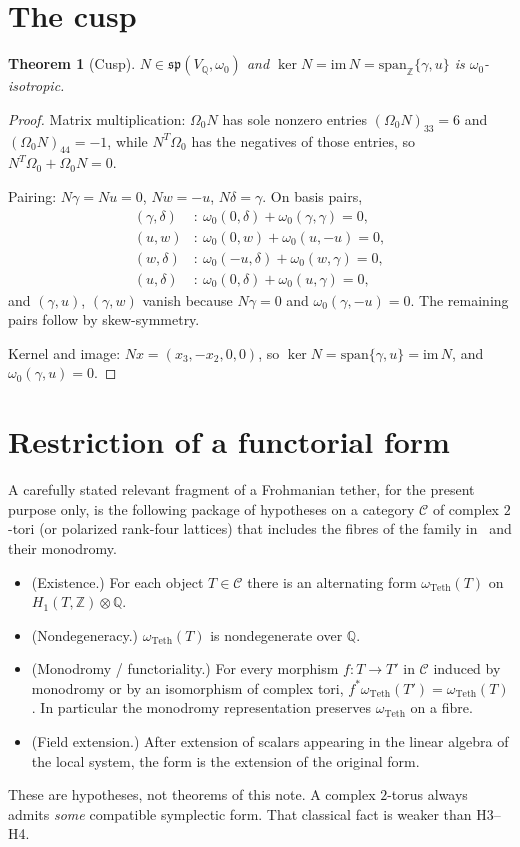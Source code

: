 \documentclass[11pt,a4paper]{article}
\newtheorem{theorem}{Theorem}
\theoremstyle{definition}
\theoremstyle{remark}
\newcommand{\Q}{\mathbb{Q}}
\newcommand{\Z}{\mathbb{Z}}
\newcommand{\spq}{\mathfrak{sp}}
\newcommand{\teth}{\omega_{\mathrm{Teth}}}
\begin{document}
\section{The cusp}

\begin{theorem}[Cusp]\label{thm:B}
$N\in\spq(V_{\Q},\omega_0)$ and $\ker N=\mathrm{im}\,N=\mathrm{span}_{\Z}\{\gamma,u\}$ is $\omega_0$-isotropic.
\end{theorem}

\begin{proof}
Matrix multiplication: $\Omega_0 N$ has sole nonzero entries $(\Omega_0 N)_{33}=6$ and $(\Omega_0 N)_{44}=-1$, while $N^T\Omega_0$ has the negatives of those entries, so $N^T\Omega_0+\Omega_0 N=0$.

Pairing: $N\gamma=Nu=0$, $Nw=-u$, $N\delta=\gamma$. On basis pairs,
\begin{align*}
(\gamma,\delta)&:\ \omega_0(0,\delta)+\omega_0(\gamma,\gamma)=0,\\
(u,w)&:\ \omega_0(0,w)+\omega_0(u,-u)=0,\\
(w,\delta)&:\ \omega_0(-u,\delta)+\omega_0(w,\gamma)=0,\\
(u,\delta)&:\ \omega_0(0,\delta)+\omega_0(u,\gamma)=0,
\end{align*}
and $(\gamma,u)$, $(\gamma,w)$ vanish because $N\gamma=0$ and $\omega_0(\gamma,-u)=0$. The remaining pairs follow by skew-symmetry.

Kernel and image: $Nx=(x_3,-x_2,0,0)$, so $\ker N=\mathrm{span}\{\gamma,u\}=\mathrm{im}\,N$, and $\omega_0(\gamma,u)=0$.
\end{proof}

\section{Restriction of a functorial form}

A carefully stated relevant fragment of a Frohmanian tether, for the present purpose only, is the following package of hypotheses on a category $\mathcal{C}$ of complex $2$-tori (or polarized rank-four lattices) that includes the fibres of the family in~\cite{AlpogeS6} and their monodromy.

\begin{itemize}
\item[\textbf{H1}] (Existence.) For each object $T\in\mathcal{C}$ there is an alternating form $\teth(T)$ on $H_1(T,\Z)\otimes\Q$.
\item[\textbf{H2}] (Nondegeneracy.) $\teth(T)$ is nondegenerate over $\Q$.
\item[\textbf{H3}] (Monodromy / functoriality.) For every morphism $f:T\to T'$ in $\mathcal{C}$ induced by monodromy or by an isomorphism of complex tori, $f^*\teth(T')=\teth(T)$. In particular the monodromy representation preserves $\teth$ on a fibre.
\item[\textbf{H4}] (Field extension.) After extension of scalars appearing in the linear algebra of the local system, the form is the extension of the original form.
\end{itemize}
These are hypotheses, not theorems of this note. A complex $2$-torus always admits \emph{some} compatible symplectic form. That classical fact is weaker than H3--H4.
\end{document}
